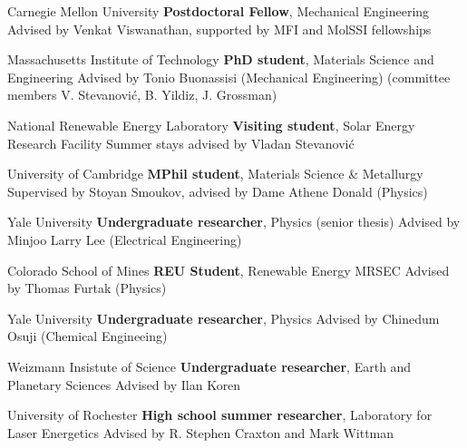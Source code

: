 	{Carnegie Mellon University}
	{\textbf{Postdoctoral Fellow}, Mechanical Engineering}
	{Advised by Venkat Viswanathan, supported by MFI and MolSSI fellowships}

\vspace{-3mm}
	{Massachusetts Institute of Technology}
	{\textbf{PhD student}, Materials Science and Engineering}
    {Advised by Tonio Buonassisi (Mechanical Engineering) (committee members V. Stevanovi\'c, B. Yildiz, J. Grossman)}

\vspace{-3mm}
    {National Renewable Energy Laboratory}
    {\textbf{Visiting student}, Solar Energy Research Facility}
    {Summer stays advised by Vladan Stevanovi\'c}

\vspace{-3mm}
    {University of Cambridge}
    {\textbf{MPhil student}, Materials Science \& Metallurgy}
    {Supervised by Stoyan Smoukov, advised by Dame Athene Donald (Physics)}

\vspace{-3mm}
    {Yale University}
    {\textbf{Undergraduate researcher}, Physics (senior thesis)}
    {Advised by Minjoo Larry Lee (Electrical Engineering)}

\vspace{-3mm}
    {Colorado School of Mines}
    {\textbf{REU Student}, Renewable Energy MRSEC}
    {Advised by Thomas Furtak (Physics)}

\vspace{-3mm}
    {Yale University}
    {\textbf{Undergraduate researcher}, Physics}
    {Advised by Chinedum Osuji (Chemical Engineeing)}

\vspace{-3mm}
    {Weizmann Insistute of Science}
    {\textbf{Undergraduate researcher}, Earth and Planetary Sciences}
    {Advised by Ilan Koren}

\vspace{-3mm}
    {University of Rochester}
    {\textbf{High school summer researcher}, Laboratory for Laser Energetics}
    {Advised by R. Stephen Craxton and Mark Wittman}